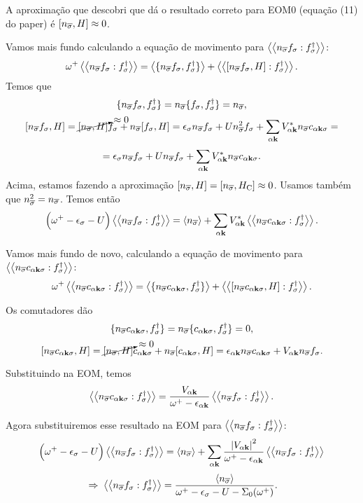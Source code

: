 \documentclass[a4paper,fleqn,12pt]{article}
\begin{document}
A aproximação que descobri que dá o resultado correto para EOM0 (equação (11) do paper) é $[n_{\overline{\sigma}}, H] \approx 0$.

Vamos mais fundo calculando a equação de movimento para $\gf{n_{\cc{\sigma}} f_\sigma}{f_\sigma^\dagger}$:
$$
\omega^+ \gf{n_{\cc{\sigma}} f_\sigma}{f_\sigma^\dagger} =
\ev{\{n_{\cc{\sigma}} f_\sigma, f_\sigma^\dagger\}} +
\gf{[n_{\cc{\sigma}} f_\sigma, H]}{f_\sigma^\dagger}.
$$
Temos que
$$
\{n_{\overline{\sigma}} f_\sigma, f_\sigma^\dagger\} =
n_{\overline{\sigma}} \{f_\sigma, f_\sigma^\dagger\}= n_{\overline{\sigma}},
$$
$$
[n_{\overline{\sigma}} f_\sigma, H] = \cancelto{\approx 0}{[n_{\overline{\sigma}}, H]} f_\sigma +
n_{\overline{\sigma}} [f_\sigma, H] =
\epsilon_\sigma n_{\overline{\sigma}} f_\sigma + U n_{\overline{\sigma}}^2 f_\sigma +
\sum_{\alpha \vb{k}} V_{\alpha \vb{k}}^* n_{\overline{\sigma}} c_{\alpha \vb{k} \sigma} =
$$
$$
= \epsilon_\sigma n_{\overline{\sigma}} f_\sigma + U n_{\overline{\sigma}} f_\sigma +
\sum_{\alpha \vb{k}} V_{\alpha \vb{k}}^* n_{\overline{\sigma}} c_{\alpha \vb{k} \sigma}.
$$
Acima, estamos fazendo a aproximação $[n_{\overline{\sigma}}, H] = [n_{\overline{\sigma}}, H_{\text{C}}] \approx 0$. Usamos também que $n_{\overline{\sigma}}^2 = n_{\overline{\sigma}}$. Temos então
$$
\Big(
\omega^+ - \eps_\sigma - U
\Big) \gf{n_{\cc{\sigma}} f_\sigma}{f_\sigma^\dagger} =
\ev{n_{\cc{\sigma}}} +
\sum_{\alpha \k} V_{\alpha \k}^*
\gf{n_{\cc{\sigma}} c_{\alpha \k \sigma}}{f_\sigma^\dagger}.
$$

Vamos mais fundo de novo, calculando a equação de movimento para $\gf{n_{\cc{\sigma}} c_{\alpha \k \sigma}}{f_\sigma^\dagger}$:
$$
\omega^+ \gf{n_{\cc{\sigma}} c_{\alpha \k \sigma}}{f_\sigma^\dagger} =
\ev{\{n_{\cc{\sigma}} c_{\alpha \k \sigma}, f_\sigma^\dagger\}} +
\gf{[n_{\cc{\sigma}} c_{\alpha \k \sigma}, H]}{f_\sigma^\dagger}.
$$

Os comutadores dão
$$
\{n_{\overline{\sigma}} c_{\alpha \vb{k} \sigma}, f_\sigma^\dagger\} =
n_{\overline{\sigma}} \{c_{\alpha \vb{k} \sigma}, f_\sigma^\dagger\} = 0,
$$
$$
[n_{\overline{\sigma}} c_{\alpha \vb{k} \sigma}, H] =
\cancelto{\approx 0}{[n_{\overline{\sigma}}, H]} c_{\alpha \vb{k} \sigma} +
n_{\overline{\sigma}} [c_{\alpha \vb{k} \sigma}, H] =
\epsilon_{\alpha \vb{k}} n_{\overline{\sigma}} c_{\alpha \vb{k} \sigma} +
V_{\alpha \vb{k}} n_{\overline{\sigma}} f_\sigma.
$$

Substituindo na EOM, temos
$$
\gf{n_{\cc{\sigma}} c_{\alpha \k \sigma}}{f_\sigma^\dagger} =
\frac{V_{\alpha \k}}{\omega^+  - \eps_{\alpha \k}}
\gf{n_{\cc{\sigma}} f_\sigma}{f_\sigma^\dagger}.
$$

Agora substituiremos esse resultado na EOM para $\gf{n_{\cc{\sigma}} f_\sigma}{f_\sigma^\dagger}$:
\begin{equation} \label{eq:not-meanfield}
\Big(
\omega^+ - \eps_\sigma - U
\Big) \gf{n_{\cc{\sigma}} f_\sigma}{f_\sigma^\dagger} =
\ev{n_{\cc{\sigma}}} +
\sum_{\alpha \k} \frac{\abs{V_{\alpha \k}}^2}{\omega^+  - \eps_{\alpha \k}}
\gf{n_{\cc{\sigma}} f_\sigma}{f_\sigma^\dagger}
\end{equation}
$$
\implies \gf{n_{\cc{\sigma}} f_\sigma}{f_\sigma^\dagger} =
\frac{\ev{n_{\cc{\sigma}}}}{\omega^+ - \eps_\sigma - U - \Sigma_0(\omega^+)}.
$$
\end{document}

